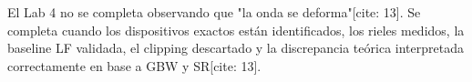 \documentclass[11pt, a4paper]{article}
\begin{document}
\begin{tcolorbox}[colback=yellow!5, colframe=black, title=\textbf{Criterio de Finalización}]
    El Lab 4 no se completa observando que "la onda se deforma"[cite: 13]. Se completa cuando los dispositivos exactos están identificados, los rieles medidos, la baseline LF validada, el clipping descartado y la discrepancia teórica interpretada correctamente en base a GBW y SR[cite: 13].
\end{tcolorbox}
\end{document}
